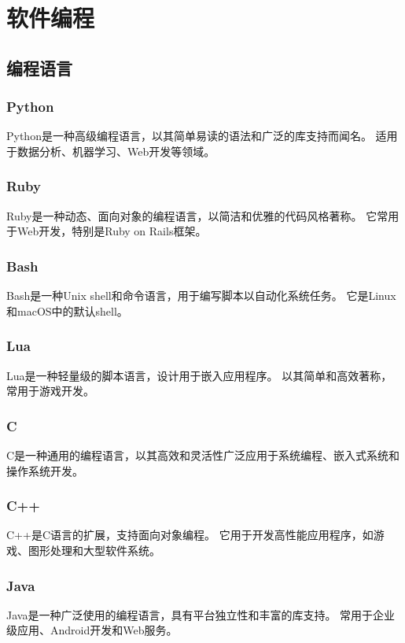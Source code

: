 \newpage
\section{软件编程}

\subsection{编程语言}

\subsubsection{Python}
Python是一种高级编程语言，以其简单易读的语法和广泛的库支持而闻名。
适用于数据分析、机器学习、Web开发等领域。

\subsubsection{Ruby}
Ruby是一种动态、面向对象的编程语言，以简洁和优雅的代码风格著称。
它常用于Web开发，特别是Ruby on Rails框架。

\subsubsection{Bash\cite{gnuBashManual}}
Bash是一种Unix shell和命令语言，用于编写脚本以自动化系统任务。
它是Linux和macOS中的默认shell。

\subsubsection{Lua}
Lua是一种轻量级的脚本语言，设计用于嵌入应用程序。
以其简单和高效著称，常用于游戏开发。

\subsubsection{C}
C是一种通用的编程语言，以其高效和灵活性广泛应用于系统编程、嵌入式系统和操作系统开发。

\subsubsection{C++}
C++是C语言的扩展，支持面向对象编程。
它用于开发高性能应用程序，如游戏、图形处理和大型软件系统。

\subsubsection{Java}
Java是一种广泛使用的编程语言，具有平台独立性和丰富的库支持。
常用于企业级应用、Android开发和Web服务。

